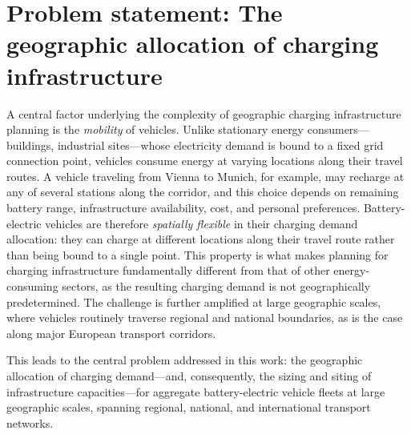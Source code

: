 \section{Problem statement: The geographic allocation of charging infrastructure}

A central factor underlying the complexity of geographic charging infrastructure planning is the \textit{mobility} of vehicles. Unlike stationary energy consumers—buildings, industrial sites—whose electricity demand is bound to a fixed grid connection point, vehicles consume energy at varying locations along their travel routes. A vehicle traveling from Vienna to Munich, for example, may recharge at any of several stations along the corridor, and this choice depends on remaining battery range, infrastructure availability, cost, and personal preferences. Battery-electric vehicles are therefore \textit{spatially flexible} in their charging demand allocation: they can charge at different locations along their travel route rather than being bound to a single point. This property is what makes planning for charging infrastructure fundamentally different from that of other energy-consuming sectors, as the resulting charging demand is not geographically predetermined. The challenge is further amplified at large geographic scales, where vehicles routinely traverse regional and national boundaries, as is the case along major European transport corridors.

This leads to the central problem addressed in this work: the geographic allocation of charging demand—and, consequently, the sizing and siting of infrastructure capacities—for aggregate battery-electric vehicle fleets at large geographic scales, spanning regional, national, and international transport networks.




